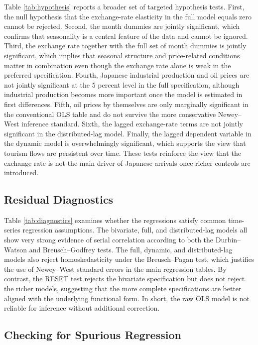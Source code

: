 \documentclass[12pt,a4paper]{article}
\begin{document}
Table \ref{tab:hypothesis} reports a broader set of targeted hypothesis tests. First, the null hypothesis that the exchange-rate elasticity in the full model equals zero cannot be rejected. Second, the month dummies are jointly significant, which confirms that seasonality is a central feature of the data and cannot be ignored. Third, the exchange rate together with the full set of month dummies is jointly significant, which implies that seasonal structure and price-related conditions matter in combination even though the exchange rate alone is weak in the preferred specification. Fourth, Japanese industrial production and oil prices are not jointly significant at the 5 percent level in the full specification, although industrial production becomes more important once the model is estimated in first differences. Fifth, oil prices by themselves are only marginally significant in the conventional OLS table and do not survive the more conservative Newey--West inference standard. Sixth, the lagged exchange-rate terms are not jointly significant in the distributed-lag model. Finally, the lagged dependent variable in the dynamic model is overwhelmingly significant, which supports the view that tourism flows are persistent over time. These tests reinforce the view that the exchange rate is not the main driver of Japanese arrivals once richer controls are introduced.

\subsection{Residual Diagnostics}

Table \ref{tab:diagnostics} examines whether the regressions satisfy common time-series regression assumptions. The bivariate, full, and distributed-lag models all show very strong evidence of serial correlation according to both the Durbin--Watson and Breusch--Godfrey tests. The full, dynamic, and distributed-lag models also reject homoskedasticity under the Breusch--Pagan test, which justifies the use of Newey--West standard errors in the main regression tables. By contrast, the RESET test rejects the bivariate specification but does not reject the richer models, suggesting that the more complete specifications are better aligned with the underlying functional form. In short, the raw OLS model is not reliable for inference without additional correction.

\subsection{Checking for Spurious Regression}
\end{document}
